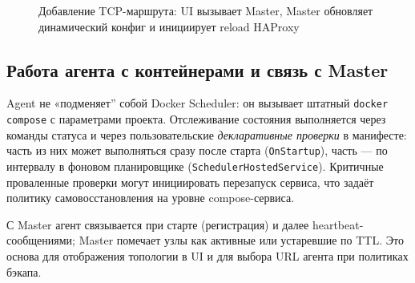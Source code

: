 \begin{figure}[!ht]
\vspace{2mm}
\centering
{}%
\vspace{3mm}
\caption{Добавление TCP-маршрута: UI вызывает Master, Master обновляет динамический конфиг и инициирует reload HAProxy}
\label{fig:tcp-routing-add}
\end{figure}

\subsection{Работа агента с контейнерами и связь с Master}

Agent не «подменяет'' собой Docker Scheduler: он вызывает штатный \texttt{docker compose} с параметрами проекта. Отслеживание состояния выполняется через команды статуса и через пользовательские \emph{декларативные проверки} в манифесте: часть из них может выполняться сразу после старта (\texttt{OnStartup}), часть --- по интервалу в фоновом планировщике (\texttt{SchedulerHostedService}). Критичные проваленные проверки могут инициировать перезапуск сервиса, что задаёт политику самовосстановления на уровне compose-сервиса.

С Master агент связывается при старте (регистрация) и далее heartbeat-сообщениями; Master помечает узлы как активные или устаревшие по TTL. Это основа для отображения топологии в UI и для выбора URL агента при политиках бэкапа.

